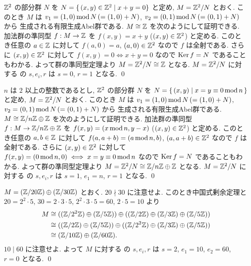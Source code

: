 \documentclass[12pt,twoside]{jarticle}
\begin{document}
\begin{example}
 ${\mathbb Z}^2$ の部分群 $N$ を $N=\{\,(x,y)\in{\mathbb Z}^2\mid x+y=0 \}$ と定め, 
 $M={\mathbb Z}^2/N$ とおく.  
 このとき $M$ は $v_1=(1,0)\mathop{\mathrm{mod}}\nolimits N\,(=(1,0)+N)$, $v_2=(0,1)\mathop{\mathrm{mod}}\nolimits N\,(=(0,1)+N)$ から
 生成される有限生成Abel群である.
 $M\cong{\mathbb Z}$ を次のようにして証明できる.
 加法群の準同型 $f:M\to{\mathbb Z}$ を $f(x,y)=x+y$ ($(x,y)\in{\mathbb Z}^2$) と定める.
 このとき任意の $a\in{\mathbb Z}$ に対して $f(a,0)=a$, $(a,0)\in{\mathbb Z}^2$ なので %
 $f$ は全射である.
 さらに $(x,y)\in{\mathbb Z}^2$ に対して $f(x,y)=0 \iff x+y=0$ なので %
 $\mathop{\mathrm{Ker}}\nolimits f = N$ であることもわかる.
 よって群の準同型定理より $M={\mathbb Z}^2/N \cong {\mathbb Z}$ となる.
 $M={\mathbb Z}^2/N$ に対する の $s,e_i,r$ 
 は $s=0$, $r=1$ となる.
 \qed
\end{example}

\begin{example}
 $n$ は $2$ 以上の整数であるとし, 
 ${\mathbb Z}^2$ の部分群 $N$ を $N=\{\,(x,y)\mid x=y\equiv 0\mathop{\mathrm{mod}}\nolimits n\,\}$ と定め, 
 $M={\mathbb Z}^2/N$ とおく.
 このとき $M$ は $v_1=(1,0)\mathop{\mathrm{mod}}\nolimits N\,(=(1,0)+N)$, $v_2=(0,1)\mathop{\mathrm{mod}}\nolimits N\,(=(0,1)+N)$ から
 生成される有限生成Abel群である.
 $M\cong{\mathbb Z}/n{\mathbb Z}\oplus{\mathbb Z}$ を次のようにして証明できる.
 加法群の準同型 $f:M\to{\mathbb Z}/n{\mathbb Z}\oplus{\mathbb Z}$ 
 を $f(x,y)=(x\mathop{\mathrm{mod}}\nolimits n, y-x)$ ($(x,y)\in{\mathbb Z}^2$) と定める.
 このとき任意の $a,b\in{\mathbb Z}$ に対して %
 $f(a,a+b)=(a\mathop{\mathrm{mod}}\nolimits n, b)$, $(a,a+b)\in{\mathbb Z}^2$ なので $f$ は全射である.
 さらに $(x,y)\in{\mathbb Z}^2$ に対して $f(x,y)=(0\mathop{\mathrm{mod}}\nolimits n, 0) \iff x=y\equiv 0\mathop{\mathrm{mod}}\nolimits n$
 なので $\mathop{\mathrm{Ker}}\nolimits f = N$ であることもわかる.
 よって群の準同型定理より $M={\mathbb Z}^2/N \cong {\mathbb Z}/n{\mathbb Z}\oplus{\mathbb Z}$ となる.
 $M={\mathbb Z}^2/N$ に対する の $s,e_i,r$ 
 は $s=1$, $e_1=n$, $r=1$ となる.
 \qed
\end{example}

\begin{example}
 $M=({\mathbb Z}/20{\mathbb Z})\oplus({\mathbb Z}/30{\mathbb Z})$ とおく. $20\nmid 30$ に注意せよ.
 このとき中国式剰余定理と $20=2^2\cdot 5$, $30=2\cdot 3\cdot 5$, 
 $2^2\cdot3\cdot5=60$, $2\cdot 5=10$ より
 \begin{align*}
  M
  &
  \cong (({\mathbb Z}/2^2{\mathbb Z})\oplus({\mathbb Z}/5{\mathbb Z}))\oplus(({\mathbb Z}/2{\mathbb Z})\oplus({\mathbb Z}/3{\mathbb Z})\oplus({\mathbb Z}/5{\mathbb Z}))
  \\ &
  \cong (({\mathbb Z}/2{\mathbb Z})\oplus({\mathbb Z}/5{\mathbb Z}))\oplus(({\mathbb Z}/2^2{\mathbb Z})\oplus({\mathbb Z}/3{\mathbb Z})\oplus({\mathbb Z}/5{\mathbb Z}))
  \\ &
  \cong ({\mathbb Z}/10{\mathbb Z})\oplus({\mathbb Z}/60{\mathbb Z}).
 \end{align*}
 $10\mid 60$ に注意せよ.
 よって $M$ に対する の $s,e_i,r$ 
 は $s=2$, $e_1=10$, $e_2=60$, $r=0$ となる.
 \qed
\end{example}
\end{document}
